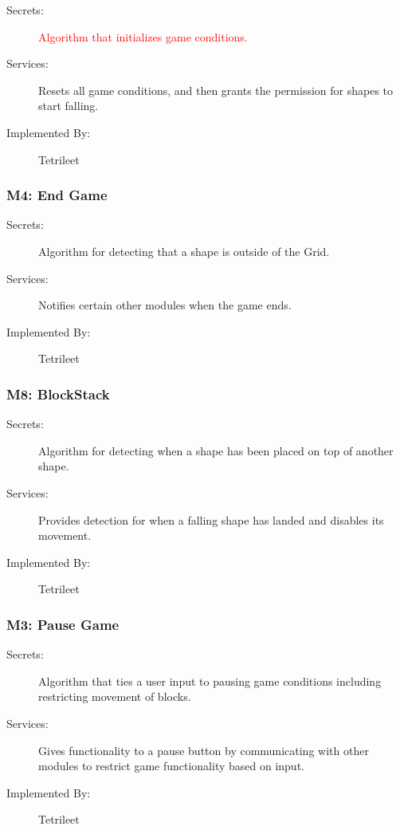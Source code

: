 \documentclass[12pt, titlepage]{article}
\begin{document}
\begin{description}
\item[Secrets:] \textcolor{red}{Algorithm that initializes game conditions.}
\item[Services:] Resets all game conditions, and then grants the permission for shapes to start falling.
\item[Implemented By:] Tetrileet
\end{description}

\subsubsection{M4: End Game}

\begin{description}
\item[Secrets:] Algorithm for detecting that a shape is outside of the Grid.
\item[Services:] Notifies certain other modules when the game ends.
\item[Implemented By:] Tetrileet
\end{description}

\subsubsection{M8: BlockStack}

\begin{description}
\item[Secrets:] Algorithm for detecting when a shape has been placed on top of another shape.
\item[Services:]Provides detection for when a falling shape has landed and disables its movement.
\item[Implemented By:] Tetrileet
\end{description}

\subsubsection{M3: Pause Game}

\begin{description}
\item[Secrets:]Algorithm that ties a user input to pausing game conditions including restricting movement of blocks. 
\item[Services:] Gives functionality to a pause button by communicating with other modules to restrict game functionality based on input.
\item[Implemented By:] Tetrileet
\end{description}
\end{document}
